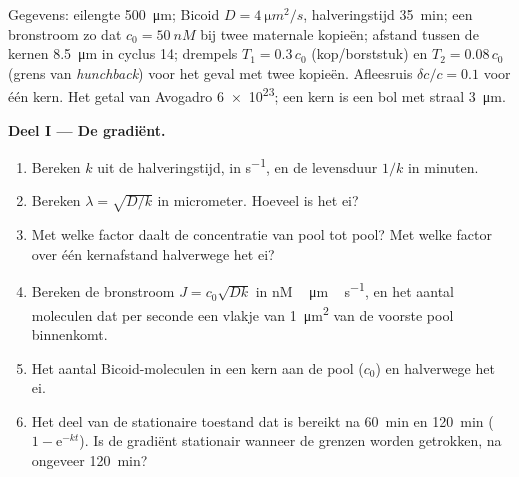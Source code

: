 \begin{problem}
\label{pb:b3:developmental-genetics:1}
Gegevens: eilengte \qty{500}{\micro m}; Bicoid $D = \qty{4}{\micro m^2/s}$,
halveringstijd \qty{35}{min}; een bronstroom zo dat $c_{0} = \qty{50}{nM}$
bij twee maternale kopieën; afstand tussen de kernen
\qty{8.5}{\micro m} in cyclus 14; drempels $T_{1} = 0.3\,c_{0}$
(kop/borststuk) en $T_{2} =
0.08\,c_{0}$ (grens van \emph{hunchback}) voor het geval met twee
kopieën. Afleesruis $\delta c/c = 0.1$ voor één kern. Het getal van
Avogadro \qty{6e23}{}; een kern is een bol met straal \qty{3}{\micro m}.

\medskip
\noindent\textbf{Deel I --- De gradiënt.}
\begin{enumerate}
  \item Bereken $k$ uit de halveringstijd, in \unit{s^{-1}}, en de
        levensduur $1/k$ in minuten.
  \item Bereken $\lambda = \sqrt{D/k}$ in micrometer. Hoeveel
         is het ei?
  \item Met welke factor daalt de concentratie van pool tot pool? Met
        welke factor over één kernafstand halverwege het ei?
  \item Bereken de bronstroom $J = c_{0}\sqrt{Dk}$ in
        \unit{nM\,\micro m\,s^{-1}}, en het aantal moleculen dat per
        seconde een vlakje van \qty{1}{\micro m^2} van de voorste pool
        binnenkomt.
  \item Het aantal Bicoid-moleculen in een kern aan de pool ($c_{0}$)
        en halverwege het ei.
  \item Het deel van de stationaire toestand dat is bereikt na
        \qty{60}{min} en \qty{120}{min} ($1 - \mathrm{e}^{-kt}$). Is de
        gradiënt stationair wanneer de grenzen worden getrokken, na
        ongeveer \qty{120}{min}?
\end{enumerate}


\end{problem}
